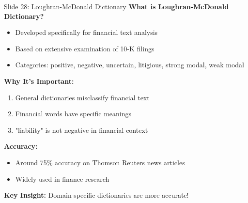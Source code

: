 \documentclass[8pt]{beamer}
\begin{document}
	\begin{frame}{Slide 28: Loughran-McDonald Dictionary}
		\fontsize{6.5}{7.5}\selectfont
		\textbf{What is Loughran-McDonald Dictionary?}
		\begin{itemize}
			\item Developed specifically for financial text analysis
			\item Based on extensive examination of 10-K filings
			\item Categories: positive, negative, uncertain, litigious, strong modal, weak modal
		\end{itemize}
		
		\vspace{0.1cm}
		\textbf{Why It's Important:}
		\begin{enumerate}
			\item General dictionaries misclassify financial text
			\item Financial words have specific meanings
			\item "liability" is not negative in financial context
		\end{enumerate}
		
		\vspace{0.1cm}
		\textbf{Accuracy:}
		\begin{itemize}
			\item Around 75\% accuracy on Thomson Reuters news articles
			\item Widely used in finance research
		\end{itemize}
		
		\textcolor{myblue}{\textbf{Key Insight:}} Domain-specific dictionaries are more accurate!
	\end{frame}
	
\end{document}
